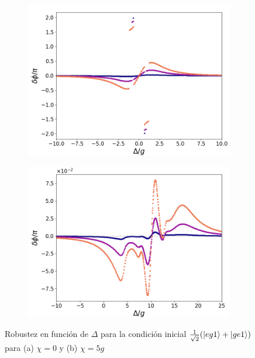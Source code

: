 \begin{figure}[h]
    \centering
    \begin{subfigure}{0.49\textwidth}
        \includegraphics[width=\textwidth]{figuras/ch5/robustez/delta/eg1+ge1 k=0.0g x=0.0g J=0.0g.png}
        \caption{}
        \label{fig5:robustez detunning 1 eg1}
    \end{subfigure}
    \hfill
    \begin{subfigure}{0.49\textwidth}
        \includegraphics[width=\textwidth]{figuras/ch5/robustez/delta/eg1+ge1 k=0.0g x=5.0g J=0.0g.png}
        \caption{}
        \label{fig5:robustez detunning 2 eg1}
    \end{subfigure}
    \caption{Robustez en función de $\Delta$ para la condición inicial $\frac{1}{\sqrt{2}}(\ket{eg1}+\ket{ge1})$ para (a) $\chi=0$ y (b) $\chi=5g$}
    \label{fig5:robustez detunning eg1}
\end{figure}
